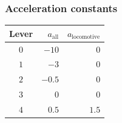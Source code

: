 \documentclass[notitlepage]{article}
\begin{document}
\subsubsection{Acceleration constants}
\begin{tabular}{|c|r|r|}
  \hline
  Lever & $a_{\text{all}}$ & $a_{\text{locomotive}}$ \\
  \hline
  $0$ & $-10$ & $0$ \\
  $1$ & $-3$ & $0$ \\
  $2$ & $-0.5$ & $0$ \\
  $3$ & $0$ & $0$ \\
  $4$ & $0.5$ & $1.5$ \\
  \hline
\end{tabular}

\ifx\HCode\undefined
\printindex
\fi
\end{document}
